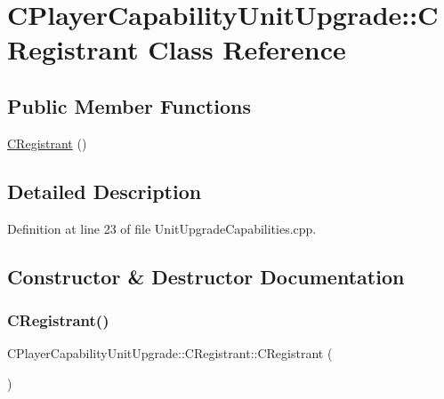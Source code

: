 \hypertarget{classCPlayerCapabilityUnitUpgrade_1_1CRegistrant}{}\section{C\+Player\+Capability\+Unit\+Upgrade\+:\+:C\+Registrant Class Reference}
\label{classCPlayerCapabilityUnitUpgrade_1_1CRegistrant}
\subsection*{Public Member Functions}
\begin{DoxyCompactItemize}
\item 
\hyperlink{classCPlayerCapabilityUnitUpgrade_1_1CRegistrant_a8f2e3658c14746284f855fadb0bfa84d}{C\+Registrant} ()
\end{DoxyCompactItemize}


\subsection{Detailed Description}


Definition at line 23 of file Unit\+Upgrade\+Capabilities.\+cpp.



\subsection{Constructor \& Destructor Documentation}
\hypertarget{classCPlayerCapabilityUnitUpgrade_1_1CRegistrant_a8f2e3658c14746284f855fadb0bfa84d}{}\label{classCPlayerCapabilityUnitUpgrade_1_1CRegistrant_a8f2e3658c14746284f855fadb0bfa84d} 
\subsubsection{\texorpdfstring{C\+Registrant()}{CRegistrant()}}
{\footnotesize\ttfamily C\+Player\+Capability\+Unit\+Upgrade\+::\+C\+Registrant\+::\+C\+Registrant (\begin{DoxyParamCaption}{ }\end{DoxyParamCaption})}



